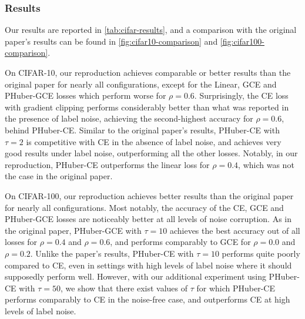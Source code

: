 \subsubsection{Results}
Our results are reported in \autoref{tab:cifar-results}, and a comparison with the original paper's results can be found in \autoref{fig:cifar10-comparison} and \autoref{fig:cifar100-comparison}.

On CIFAR-10, our reproduction achieves comparable or better results than the original paper for nearly all configurations, except for the Linear, GCE and PHuber-GCE losses which perform worse for $\rho=0.6$. Surprisingly, the CE loss with gradient clipping performs considerably better than what was reported in the presence of label noise, achieving the second-highest accuracy for $\rho=0.6$, behind PHuber-CE. Similar to the original paper's results, PHuber-CE with $\tau=2$ is competitive with CE in the absence of label noise, and achieves very good results under label noise, outperforming all the other losses. Notably, in our reproduction, PHuber-CE outperforms the linear loss for $\rho=0.4$, which was not the case in the original paper.

On CIFAR-100, our reproduction achieves better results than the original paper for nearly all configurations. Most notably, the accuracy of the CE, GCE and PHuber-GCE losses are noticeably better at all levels of noise corruption. As in the original paper, PHuber-GCE with $\tau=10$ achieves the best accuracy out of all losses for $\rho=0.4$ and $\rho=0.6$, and performs comparably to GCE for $\rho=0.0$ and $\rho=0.2$. Unlike the paper's results, PHuber-CE with $\tau=10$ performs quite poorly compared to CE, even in settings with high levels of label noise where it should supposedly perform well. 
However, with our additional experiment using PHuber-CE with $\tau=50$, we show that there exist values of $\tau$ for which PHuber-CE performs comparably to CE in the noise-free case, and outperforms CE at high levels of label noise.

